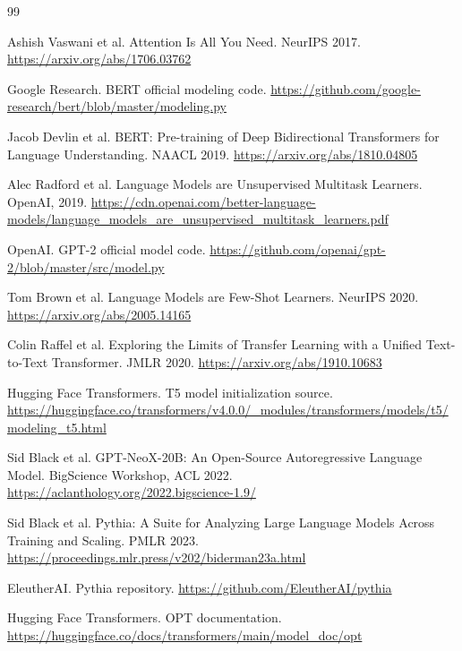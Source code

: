 \documentclass[UTF8,a4paper,11pt]{ctexart}
\begin{document}
\begin{thebibliography}{99}

Ashish Vaswani et al.
\newblock Attention Is All You Need.
\newblock NeurIPS 2017.
\newblock \url{https://arxiv.org/abs/1706.03762}

Google Research.
\newblock BERT official modeling code.
\newblock \url{https://github.com/google-research/bert/blob/master/modeling.py}

Jacob Devlin et al.
\newblock BERT: Pre-training of Deep Bidirectional Transformers for Language Understanding.
\newblock NAACL 2019.
\newblock \url{https://arxiv.org/abs/1810.04805}

Alec Radford et al.
\newblock Language Models are Unsupervised Multitask Learners.
\newblock OpenAI, 2019.
\newblock \url{https://cdn.openai.com/better-language-models/language_models_are_unsupervised_multitask_learners.pdf}

OpenAI.
\newblock GPT-2 official model code.
\newblock \url{https://github.com/openai/gpt-2/blob/master/src/model.py}

Tom Brown et al.
\newblock Language Models are Few-Shot Learners.
\newblock NeurIPS 2020.
\newblock \url{https://arxiv.org/abs/2005.14165}

Colin Raffel et al.
\newblock Exploring the Limits of Transfer Learning with a Unified Text-to-Text Transformer.
\newblock JMLR 2020.
\newblock \url{https://arxiv.org/abs/1910.10683}

Hugging Face Transformers.
\newblock T5 model initialization source.
\newblock \url{https://huggingface.co/transformers/v4.0.0/_modules/transformers/models/t5/modeling_t5.html}

Sid Black et al.
\newblock GPT-NeoX-20B: An Open-Source Autoregressive Language Model.
\newblock BigScience Workshop, ACL 2022.
\newblock \url{https://aclanthology.org/2022.bigscience-1.9/}

Sid Black et al.
\newblock Pythia: A Suite for Analyzing Large Language Models Across Training and Scaling.
\newblock PMLR 2023.
\newblock \url{https://proceedings.mlr.press/v202/biderman23a.html}

EleutherAI.
\newblock Pythia repository.
\newblock \url{https://github.com/EleutherAI/pythia}

Hugging Face Transformers.
\newblock OPT documentation.
\newblock \url{https://huggingface.co/docs/transformers/main/model_doc/opt}


\end{thebibliography}
\end{document}
